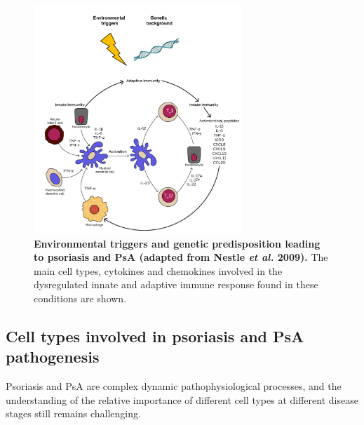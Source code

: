 \begin{figure}[htb]
\centering
\includegraphics[width=0.7\textwidth]{./Introduction/pdfs/PSO_adaptive_innate_immune_system_crosstalk_new}
\caption[Environmental triggers and genetic predisposition leading to psoriasis and PsA (adapted from Nestle \textit{et al.} 2009).]{\textbf{Environmental triggers and genetic predisposition leading to psoriasis and PsA (adapted from Nestle \textit{et al.} 2009).} The main cell types, cytokines and chemokines involved in the dysregulated innate and adaptive immune response found in these conditions are shown.}
\label{fig:PSO_immune_system_diagram}
\end{figure}

\subsection{Cell types involved in psoriasis and PsA pathogenesis}

Psoriasis and PsA are complex dynamic pathophysiological processes, and the understanding of the relative importance of different cell types at different disease stages still remains challenging.


